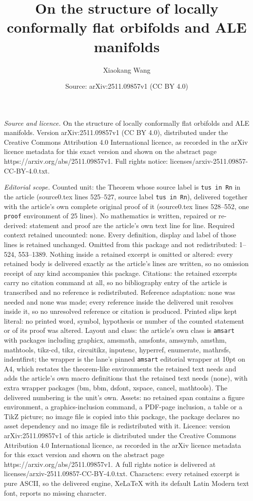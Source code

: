 \documentclass[10pt,a4paper]{amsart}
\title[On the structure of locally conformally flat orbifolds and A]{On the structure of locally conformally flat orbifolds and ALE manifolds}
\author{Xiaokang Wang}
\date{Source: arXiv:2511.09857v1 (CC BY 4.0)}
\begin{document}
\maketitle

\noindent\emph{Source and licence.} On the structure of locally conformally flat orbifolds and ALE manifolds. Version arXiv:2511.09857v1 (CC BY 4.0), distributed under the Creative Commons Attribution 4.0 International licence, as recorded in the arXiv licence metadata for this exact version and shown on the abstract page https://arxiv.org/abs/2511.09857v1. Full rights notice: licenses/arxiv-2511.09857-CC-BY-4.0.txt.\par\smallskip

\noindent\textit{Editorial scope.} Counted unit: the Theorem whose source label is \texttt{tus in Rn} in the article (source0.tex lines 525--527, source label \texttt{tus in Rn}), delivered together with the article's own complete original proof of it (source0.tex lines 528--552, one \texttt{proof} environment of 25 lines). No mathematics is written, repaired or re-derived: statement and proof are the article's own text line for line. Required context retained uncounted: none. Every definition, display and label of those lines is retained unchanged. Omitted from this package and not redistributed: 1--524, 553--1389. Nothing inside a retained excerpt is omitted or altered: every retained body is delivered exactly as the article's lines are written, so no omission receipt of any kind accompanies this package. Citations: the retained excerpts carry no citation command at all, so no bibliography entry of the article is transcribed and no reference is redistributed. Reference adaptation: none was needed and none was made; every reference inside the delivered unit resolves inside it, so no unresolved reference or citation is produced. Printed slips kept literal: no printed word, symbol, hypothesis or number of the counted statement or of its proof was altered. Layout and class: the article's own class is \texttt{amsart} with packages including graphicx, amsmath, amsfonts, amssymb, amsthm, mathtools, tikz-cd, tikz, circuitikz, inputenc, hyperref, enumerate, mathrsfs, indentfirst; the wrapper is the lane's pinned \texttt{amsart} editorial wrapper at 10pt on A4, which restates the theorem-like environments the retained text needs and adds the article's own macro definitions that the retained text needs (none), with extra wrapper packages (bm, bbm, dsfont, xspace, cancel, mathtools). The delivered numbering is the unit's own. Assets: no retained span contains a figure environment, a graphics-inclusion command, a PDF-page inclusion, a table or a TikZ picture; no image file is copied into this package, the package declares no asset dependency and no image file is redistributed with it. Licence: version arXiv:2511.09857v1 of this article is distributed under the Creative Commons Attribution 4.0 International licence, as recorded in the arXiv licence metadata for this exact version and shown on the abstract page https://arxiv.org/abs/2511.09857v1. A full rights notice is delivered at licenses/arxiv-2511.09857-CC-BY-4.0.txt. Characters: every retained excerpt is pure ASCII, so the delivered engine, XeLaTeX with its default Latin Modern text font, reports no missing character.
\end{document}
